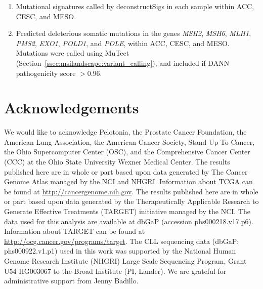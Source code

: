 \begin{enumerate}
	\item Mutational signatures called by deconstructSigs in each sample within ACC, CESC, and MESO.
	\item Predicted deleterious somatic mutations in the genes \textit{MSH2}, \textit{MSH6}, \textit{MLH1}, \textit{PMS2}, \textit{EXO1}, \textit{POLD1}, and \textit{POLE}, within ACC, CESC, and MESO. Mutations were called using MuTect (Section~\ref{ssec:msilandscape:variant_calling}), and included if DANN pathogenicity score $>0.96$.
\end{enumerate}

\section*{Acknowledgements}
We would like to acknowledge Pelotonia, the Prostate Cancer Foundation, the American Lung Association, the American Cancer Society, Stand Up To Cancer, the Ohio Supercomputer Center (OSC), and the Comprehensive Cancer Center (CCC) at the Ohio State University Wexner Medical Center. The results published here are in whole or part based upon data generated by The Cancer Genome Atlas managed by the NCI and NHGRI. Information about TCGA can be found at \url{http://cancergenome.nih.gov}. The results published here are in whole or part based upon data generated by the Therapeutically Applicable Research to Generate Effective Treatments (TARGET) initiative managed by the NCI. The data used for this analysis are available at dbGaP (accession phs000218.v17.p6). Information about TARGET can be found at \url{http://ocg.cancer.gov/programs/target}. The CLL sequencing data (dbGaP: phs000922.v1.p1) used in this work was supported by the National Human Genome Research Institute (NHGRI) Large Scale Sequencing Program, Grant U54 HG003067 to the Broad Institute (PI, Lander). We are grateful for administrative support from Jenny Badillo.
